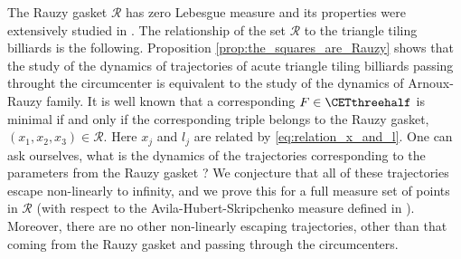 \documentclass[12pt]{article}
\theoremstyle{definition}
\newtheorem{definition}{Definition}
\begin{document}
The Rauzy gasket  $\boldsymbol{\mathcal{R}}$ has zero Lebesgue measure \cite{AS13} and its properties were extensively studied in \cite{AR91, AHS16, AHS16-1}. 
The relationship of the set $\boldsymbol{\mathcal{R}}$ to the triangle tiling billiards is the following. Proposition \ref{prop:the_squares_are_Rauzy} shows that the study of the dynamics of trajectories of acute triangle tiling billiards passing throught the circumcenter is equivalent to the study of the dynamics of Arnoux-Rauzy family. It is well known \cite{AR91} that a corresponding $F \in \CETthreehalf$ is minimal if and only if the corresponding triple belongs to the Rauzy gasket,  $(x_1, x_2, x_3) \in \boldsymbol{\mathcal{R}}$. Here $x_j$ and $l_j$ are related by \eqref{eq:relation_x_and_l}. One can ask ourselves, what is the dynamics of the trajectories corresponding to the parameters from the Rauzy gasket ? We conjecture that all of these trajectories escape non-linearly to infinity, and we prove this for a full measure set of points in  $\boldsymbol{\mathcal{R}}$ (with respect to the Avila-Hubert-Skripchenko measure defined in \cite{AHS16}). Moreover, there are no other non-linearly escaping trajectories, other than that coming from the Rauzy gasket and passing through the circumcenters.

%
\end{document}
